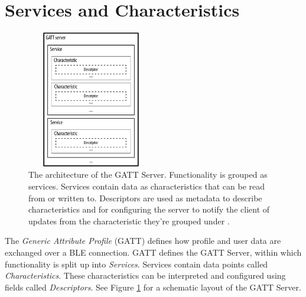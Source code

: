 \section{Services and Characteristics}
\begin{figure}[]
    \centering
    \includegraphics[width=0.5\textwidth,height=6cm,keepaspectratio=true]{images/gatt_service}
    \caption{
        The architecture of the GATT Server. Functionality is grouped as services. Services contain data as characteristics that can be read from or written to. Descriptors are used as metadata to describe characteristics and for configuring the server to notify the client of updates from the characteristic they're grouped under \cite{townsend_cufi}.
    }
    \label{fig:gatt_server}
\end{figure}
The \textit{Generic Attribute Profile} (GATT) defines how profile and user data are exchanged over a BLE connection. GATT defines the GATT Server, within which functionality is split up into \textit{Services}. Services contain data points called \textit{Characteristics}. These characteristics can be interpreted and configured using fields called \textit{Descriptors}. See Figure \ref{fig:gatt_server} for a schematic layout of the GATT Server.

